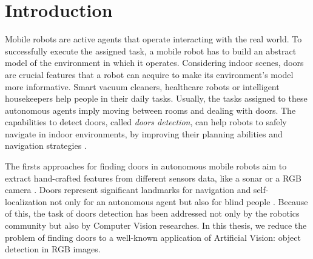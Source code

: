 
\hypertarget{Introduzione}{%
	\chapter{Introduction}\label{header-n3}}

Mobile robots are active agents that operate interacting with the real world. To successfully execute the assigned task, a mobile robot has to build an abstract model of the environment in which it operates. Considering indoor scenes, doors are crucial features that a robot can acquire to make its environment's model more informative.  Smart vacuum cleaners, healthcare robots or intelligent housekeepers help people in their daily tasks. Usually, the tasks assigned to these autonomous agents imply moving between rooms and dealing with doors. The capabilities to detect doors, called \emph{doors detection}, can help robots to safely navigate in indoor environments, by improving their planning abilities and navigation strategies \cite{sonarandivisualdoordetection, doorsandnavigation, humanoid}. 

The firsts approaches for finding doors in autonomous mobile robots aim to extract hand-crafted features from different sensors data, like a sonar \cite{sonarandivisualdoordetection} or a RGB camera \cite{humanoid}. Doors represent significant landmarks for navigation and self-localization not only for an autonomous agent but also for blind people \cite{edgeandcornerdoorsdetector}. Because of this, the task of doors detection has been addressed not only by the robotics community but also by Computer Vision researches. In this thesis, we reduce the problem of finding doors to a well-known application of Artificial Vision: object detection in RGB images. 

